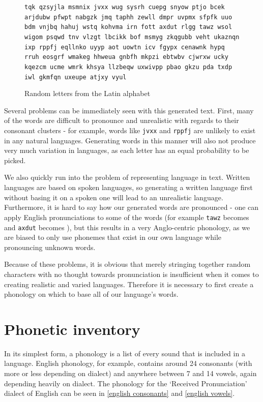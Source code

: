 \documentclass{report}
\begin{document}
   \begin{figure}[h]
   \caption{Random letters from the Latin alphabet}
   \label{random letters from latin alphabet}  
   \begin{tcolorbox}
\texttt{tqk qzsyjla msmnix jvxx wug sysrh cuepg snyow ptjo bcek arjdubw pfwpt nabgzk jmq taphh zewll dmpr uvpmx sfpfk uuo bdm vnjbq hahuj wstq kohvma irn fott axdut rlgg tawz wsol wigom psqwd tnv vlzgt lbcikk bof msmyg zkqgubb veht ukaznqn ixp rppfj eqllnko uyyp aot uowtn icv fgypx cenawnk hypq rruh eosgrf wmakeg hhweua gnbfh mkpzi ebtwbv cjwrxw ucky kqezcm ucme wmrk khsya llzbeqw uxwivpp pbao gkzu pda txdp iwl gkmfqn uxeupe atjxy vyul}
   \end{tcolorbox}
\end{figure}
   
   Several problems can be immediately seen with this generated text. First, many of the words are difficult to pronounce and unrealistic with regards to their consonant clusters - for example, words like \verb|jvxx| and \verb|rppfj| are unlikely to exist in any natural languages. Generating words in this manner will also not produce very much variation in languages, as each letter has an equal probability to be picked.
   
   We also quickly run into the problem of representing language in text. Written languages are based on spoken languages, so generating a written language first without basing it on a spoken one will lead to an unrealistic language. Furthermore, it is hard to say how our generated words are pronounced - one can apply English pronunciations to some of the words (for example \verb|tawz| becomes  and \verb|axdut| becomes ), but this results in a very Anglo-centric phonology, as we are biased to only use phonemes that exist in our own language while pronouncing unknown words.
   
   Because of these problems, it is obvious that merely stringing together random characters with no thought towards pronunciation is insufficient when it comes to creating realistic and varied languages. Therefore it is necessary to first create a phonology on which to base all of our language's words.
   
   \section{Phonetic inventory}
   
   In its simplest form, a phonology is a list of every sound that is included in a language. English phonology, for example, contains around 24 consonants (with more or less depending on dialect) and anywhere between 7 and 14 vowels, again depending heavily on dialect. The phonology for the `Received Pronunciation' dialect of English can be seen in \ref{english consonants} and \ref{english vowels}.
   
\end{document}
